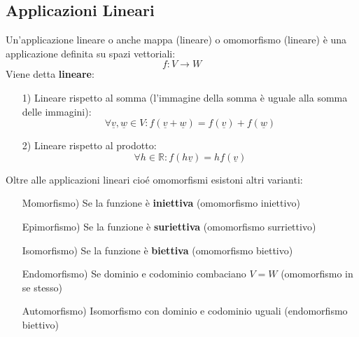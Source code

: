 \subsection{Applicazioni Lineari}
Un'applicazione lineare o anche mappa (lineare) o omomorfismo (lineare) è una applicazione definita su spazi vettoriali:
$$ f: V \rightarrow W $$
Viene detta \textbf{lineare}:
\begin{itemize}
\item[1)] Lineare rispetto al somma (l’immagine della somma è uguale alla somma delle immagini):
$$ \forall \underline{v}, \underline{w} \in V: f(\underline{v}+\underline{w}) = f(\underline{v}) + f(\underline{w}) $$
\item[2)] Lineare rispetto al prodotto:
$$ \forall h \in \mathbb{R}: f(h\underline{v}) = h f(\underline{v}) $$
\end{itemize}

Oltre alle applicazioni lineari cioé omomorfismi esistoni altri varianti:
\begin{itemize}
\item[Momorfismo)] Se la funzione è \textbf{iniettiva} (omomorfismo iniettivo)
\item[Epimorfismo)] Se la funzione è \textbf{suriettiva} (omomorfismo surriettivo)
\item[Isomorfismo)] Se la funzione è \textbf{biettiva} (omomorfismo biettivo)
\item[Endomorfismo)] Se dominio e codominio combaciano $V = W$ (omomorfismo in se stesso)
\item[Automorfismo)] Isomorfismo con dominio e codominio uguali (endomorfismo biettivo)
\end{itemize}

